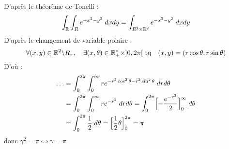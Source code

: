 \begin{example}[Gaussienne]
    \vspace{0.5cm}
    D'après le théorème de Tonelli :
    \[ \int_{\mathbb{R}} \int_R e^{-x^2-y^2} \; dxdy  = \int_{R^2 \times \mathbb{R}^2} e^{-x^2-y^2} \; dxdy  \] 
    D'après le changement de variable polaire :
    \[ \forall (x,y) \in \mathbb{R}^2 \backslash R_\pi, \quad \exists (x,\theta) \in \mathbb{R}_+^* \times ]0,2\pi[ \text{ tq} \quad (x,y) = (r \cos \theta, r \sin \theta) \]
    D'où : 
    \begin{align*}
        \dots &= \int_{0}^{2\pi} \int_{0}^{\infty} r e^{-r^2 \cos^2 \theta - r^2 \sin^2 \theta} \; dr d\theta \\
            &= \int_{0}^{2\pi} \int_{0}^{\infty} r e^{-r^2} \; dr d \theta = \int_{0}^{2\pi} \Bigl[ - \frac{e^{-r^2}}{2}\Bigr]_0^\infty \; d \theta \\
            &= \int_{0}^{2\pi} \frac{1}{2} \; d \theta = \Bigl[ \frac{1}{2} \theta\Bigr]_0^{2\pi} = \pi 
    \end{align*}
    donc $ \gamma^2 = \pi \Longleftrightarrow \gamma = \pi $
\end{example}

